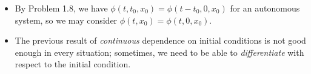 \documentclass[../notes.tex]{subfiles}
\begin{document}
\begin{itemize}
\begin{proof}
        \begin{align*}
            \Delta(t) &= \left| \int_{t_0}^tf(r,\phi(r,t_0,y_0))\dd{r}-\int_{s_0}^tf(r,\phi(r,s_0,y_0))\dd{r} \right|\\
            &= \left| \int_{t_0}^{s_0}f(r,\phi(r,t_0,y_0))\dd{r}+\int_{s_0}^tf(r,\phi(r,t_0,y_0))\dd{r}-\int_{s_0}^tf(r,\phi(r,s_0,y_0))\dd{r} \right|\\
            &\leq \int_{t_0}^{s_0}|f(r,\phi(r,t_0,y_0))|\dd{r}+\int_{s_0}^t|f(r,\phi(r,t_0,y_0))-f(r,\phi(r,s_0,y_0))|\dd{r}\\
            &\leq |t_0-s_0|M+L\int_{s_0}^t\Delta(r)\dd{r}
        \end{align*}
        Therefore, by Gr\"{o}nwall's inequality (as in Problem \ref{prb:2.12}; note that $\gamma=0$ here),
        \begin{equation*}
            \Delta(t) \leq |t_0-s_0|M\e[L|t-s_0|]
        \end{equation*}
        as desired.
    \end{proof}
    \item By Problem 1.8, we have $\phi(t,t_0,x_0)=\phi(t-t_0,0,x_0)$ for an autonomous system, so we may consider $\phi(t,x_0)=\phi(t,0,x_0)$.
    \item The previous result of \emph{continuous} dependence on initial conditions is not good enough in every situation; sometimes, we need to be able to \emph{differentiate} with respect to the initial condition.
\end{itemize}
\end{document}
